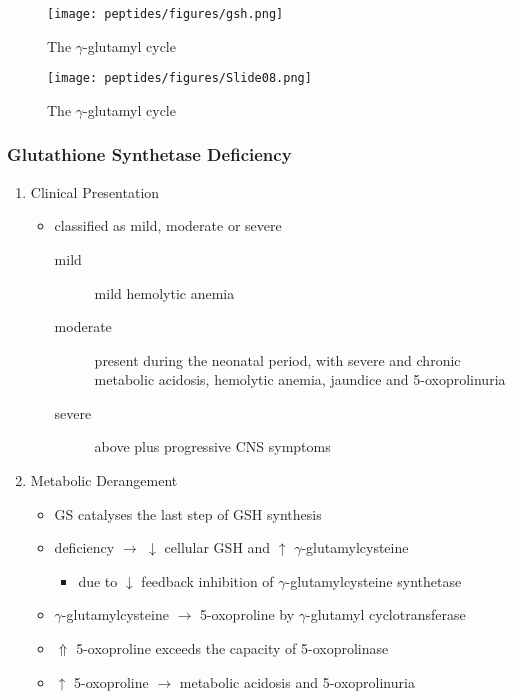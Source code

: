 \documentclass[12pt]{scrartcl}
\begin{document}
\begin{figure}[htbp]
\centering
\texttt{[image: peptides/figures/gsh.png]}
\caption{\label{fig:orgc4507d0}The \(\gamma\)-glutamyl cycle}
\end{figure}


\begin{figure}[htbp]
\centering
\texttt{[image: peptides/figures/Slide08.png]}
\caption{\label{fig:org323858b}The \(\gamma\)-glutamyl cycle}
\end{figure}


\subsubsection{Glutathione Synthetase Deficiency}
\label{sec:org8bf9b2c}
\begin{enumerate}
\item Clinical Presentation
\label{sec:org72d1923}
\begin{itemize}
\item classified as mild, moderate or severe
\begin{description}
\item[{mild}] mild hemolytic anemia
\item[{moderate}] present during the neonatal period, with severe and
chronic metabolic acidosis, hemolytic anemia, jaundice
and 5-oxoprolinuria
\item[{severe}] above plus progressive CNS symptoms
\end{description}
\end{itemize}

\item Metabolic Derangement
\label{sec:org6474e31}
\begin{itemize}
\item GS catalyses the last step of GSH synthesis
\item deficiency \(\to\) \(\downarrow\) cellular GSH and \(\uparrow\) \(\gamma\)-glutamylcysteine
\begin{itemize}
\item due to \(\downarrow\) feedback inhibition of \(\gamma\)-glutamylcysteine synthetase
\end{itemize}
\item \(\gamma\)-glutamylcysteine \(\to\) 5-oxoproline by \(\gamma\)-glutamyl
cyclotransferase
\item \(\Uparrow\) 5-oxoproline exceeds the capacity of 5-oxoprolinase
\item \(\uparrow\) 5-oxoproline \(\to\) metabolic acidosis and 5-oxoprolinuria
\end{itemize}


\end{enumerate}
\end{document}
